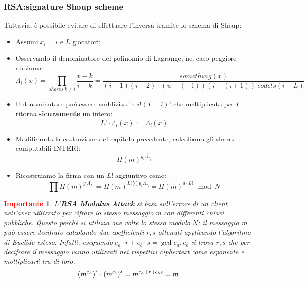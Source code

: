 \documentclass{book}
\newtheorem*{Importante}{\textbf{\textcolor{red}{Importante}}}
\begin{document}
\subsubsection{RSA:signature Shoup scheme}
Tuttavia, è possibile evitare di effettuare l'inversa tramite lo schema di Shoup:\begin{itemize}
    \item Assumi \(x_{i}=i\) e \(L\) giocatori;
    \item Osservando il denominatore del polinomio di Lagrange, nel caso peggiore abbiamo:\begin{equation*}
        \Lambda_{i}(x)=\prod_{shares\ k\neq i}{\frac{x-k}{i-k}}=\frac{something(x)}{(i-1)(i-2)\cdots (u-(-1))(i-(i+1))\ codots (i-L)}
    \end{equation*}
    \item Il denominatore può essere suddiviso in \(i!(L-i)! \) che moltiplicato per \(L\) ritorna \textbf{sicuramente} un intero:\begin{equation*}
        L! \cdot \Lambda_{i}(x):=\overline{\Lambda_{i}}(x)
    \end{equation*}
    \item Modificando la costruzione del capitolo precedente, calcoliamo gli shares computabili INTERI:\begin{equation*}
        {H(m)}^{y_{i}\overline{\Lambda_{x_{i}}}}
    \end{equation*}
    \item Ricostruiamo la firma con un \(L! \) aggiuntivo come:\begin{equation*}
        \prod{H(m)}^{y_{i}\overline{\Lambda_{x_{i}}}}={H(m)}^{L! \sum{y_{i}\Lambda_{x_{i}}}}={H(m)}^{d\cdot L! }\mod{N}
    \end{equation*}
\end{itemize}
\begin{Importante}
    L'\textbf{RSA Modulus Attack} si basa sull'errore di un client nell'aver utilizzato per cifrare lo stesso messaggio m con differenti chiavi pubbliche\@. Questo perché si utilizza due volte lo stesso modulo \(N\): il messaggio m può essere decifrato calcolando due coefficienti \(r,s\) ottenuti applicando l'algoritmo di Euclide esteso\@. \newline
    Infatti, eseguendo \(e_{a}\cdot r+e_{b}\cdot s=\gcd{e_{a},e_{b}} \) si trova \(r,s\) che per decifrare il messaggio vanno utilizzati nei rispettivi ciphertext come esponente e moltiplicarli tra di loro.
    \begin{equation*}
        \centering
        {(m^{e_{a}})}^{r}\cdot {(m^{e_{b}})}^{s}=m^{e_{a}+r+e_{b}s}=m
    \end{equation*}
\end{Importante}
\end{document}
